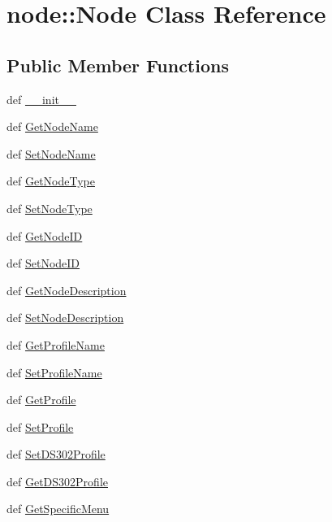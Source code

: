 \hypertarget{classnode_1_1Node}{
\section{node::Node Class Reference}
\label{classnode_1_1Node}
}
\subsection*{Public Member Functions}
\begin{CompactItemize}
\item 
def \hyperlink{classnode_1_1Node_40b0e5cff99fbfc4ab0999c16ad431ee}{\_\-\_\-init\_\-\_\-}
\item 
def \hyperlink{classnode_1_1Node_6eff921e4bda68b120e02b070b91d5b8}{Get\-Node\-Name}
\item 
def \hyperlink{classnode_1_1Node_541cc4bb271d7a6bc215150b37a4b56f}{Set\-Node\-Name}
\item 
def \hyperlink{classnode_1_1Node_de5ee2b5a7f99d7ad36d86b2850d5d45}{Get\-Node\-Type}
\item 
def \hyperlink{classnode_1_1Node_33a22d325064e662bd8c11a0ac8c59c3}{Set\-Node\-Type}
\item 
def \hyperlink{classnode_1_1Node_98806729923304d6714c82023eda0f93}{Get\-Node\-ID}
\item 
def \hyperlink{classnode_1_1Node_9fab825543cfcbcab07e988c5a353f3e}{Set\-Node\-ID}
\item 
def \hyperlink{classnode_1_1Node_aa4d259f97c23b4e53a8b1280a5e2b86}{Get\-Node\-Description}
\item 
def \hyperlink{classnode_1_1Node_c71e316ad45f58b4e230e6d47ba8d607}{Set\-Node\-Description}
\item 
def \hyperlink{classnode_1_1Node_20edc3356c0700d5513dfddb4c882ee2}{Get\-Profile\-Name}
\item 
def \hyperlink{classnode_1_1Node_a138775ce0f4eb9fd4185aaa8f1cbd61}{Set\-Profile\-Name}
\item 
def \hyperlink{classnode_1_1Node_9620fa2bc377b7e06c39b557c5c73363}{Get\-Profile}
\item 
def \hyperlink{classnode_1_1Node_5b97c9c35ddd35f7d760abe49285d20a}{Set\-Profile}
\item 
def \hyperlink{classnode_1_1Node_1491687050feb7aa267e83fbe3379631}{Set\-DS302Profile}
\item 
def \hyperlink{classnode_1_1Node_65b0ff7710846dc865eeff2de2acd948}{Get\-DS302Profile}
\item 
def \hyperlink{classnode_1_1Node_5b69098e7e38001df37d95a3e656aa6e}{Get\-Specific\-Menu}

\end{CompactItemize}
